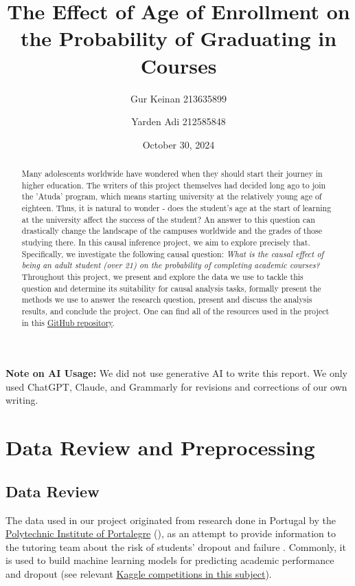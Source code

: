 \documentclass[11pt]{article}
\title{The Effect of Age of Enrollment on the Probability of Graduating in Courses}
\author{Gur Keinan 213635899 \and Yarden Adi 212585848}
\date{October 30, 2024}
\newcommand{\gur}[1]{{\color{teal}{Gur: #1}}}
\begin{document}
\maketitle

\begin{abstract}
    Many adolescents worldwide have wondered when they should start their journey in higher education. The writers of this project themselves had decided long ago to join the 'Atuda' program, which means starting university at the relatively young age of eighteen. Thus, it is natural to wonder - does the student's age at the start of learning at the university affect the success of the student? An answer to this question can drastically change the landscape of the campuses worldwide and the grades of those studying there. In this causal inference project, we aim to explore precisely that. Specifically, we investigate the following causal question: \emph{What is the causal effect of being an adult student (over 21) on the probability of completing academic courses?} Throughout this project, we present and explore the data we use to tackle this question and determine its suitability for causal analysis tasks, formally present the methods we use to answer the research question, present and discuss the analysis results, and conclude the project. One can find all of the resources used in the project in this \href{https://github.com/GurKeinan/Causal-Inference-Project-Effect-of-Age-on-Graduating}{GitHub repository}.
\end{abstract}

\textbf{Note on AI Usage:} We did not use generative AI to write this report. We only used ChatGPT, Claude, and Grammarly for revisions and corrections of our own writing.

\section{Data Review and Preprocessing}

\gur{Opening sentence.}

\subsection{Data Review}

The data used in our project originated from research done in Portugal by the \href{https://www.ipportalegre.pt/pt/}{Polytechnic Institute of Portalegre} (\gur{Equivalent to college}), as an attempt to provide information to the tutoring team about the risk of students' dropout and failure \citep{data7110146}. Commonly, it is used to build machine learning models for predicting academic performance and dropout (see relevant \href{https://www.kaggle.com/datasets/ankanhore545/dropout-or-academic-success/data}{Kaggle competitions in this subject}).
\end{document}
